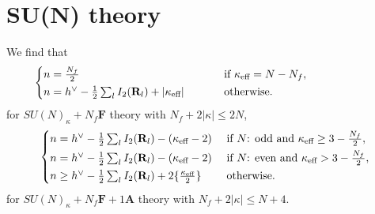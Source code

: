 \documentclass[letterpaper, 11pt]{article}
\def\k{\kappa}
\begin{document}
{\section{SU(N) theory}
\label{sec:bound-su}
We find that 
\begin{align}
  \hspace{-2.2cm}
  \begin{dcases}
  n = \textstyle \frac{N_f}{2}
  & \hspace{0.8cm} \textstyle\text{ if }  \kappa_\text{eff} = N - N_f, \\
  n = \textstyle h^\vee - \frac{1}{2} \sum_{l}I_2(\mathbf{R}_l) + |\k_\text{eff}| 
  & \hspace{0.8cm}\textstyle\text{ otherwise}.
  \end{dcases}
\end{align}
for $SU(N)_\kappa + N_f\mathbf{F}$ theory  with $N_f + 2|\kappa| \leq 2N$, 
\begin{align}
  \begin{dcases}
    n  = \textstyle h^\vee - \frac{1}{2} \sum_{l}I_2(\mathbf{R}_l)  - (\k_\text{eff}-2) & \textstyle\text{ if $N$: odd and }  \kappa_\text{eff} \geq 3 - \frac{N_f}{2},\\
    n  = \textstyle h^\vee - \frac{1}{2} \sum_{l}I_2(\mathbf{R}_l)  - (\k_\text{eff}-2) & \textstyle\text{ if $N$: even and }  \kappa_\text{eff} > 3 - \frac{N_f}{2}  ,\\
    n  \geq 
     \textstyle h^\vee - \frac{1}{2} \sum_{l}I_2(\mathbf{R}_l) + 2\{\frac{\k_\text{eff}}{2}\}
     &\textstyle\text{ otherwise}.
  \end{dcases}
\end{align}
for $SU(N)_\kappa + N_f\mathbf{F} + 1\mathbf{A}$ theory with $N_f + 2|\kappa| \leq N+4$. 

}
\end{document}

